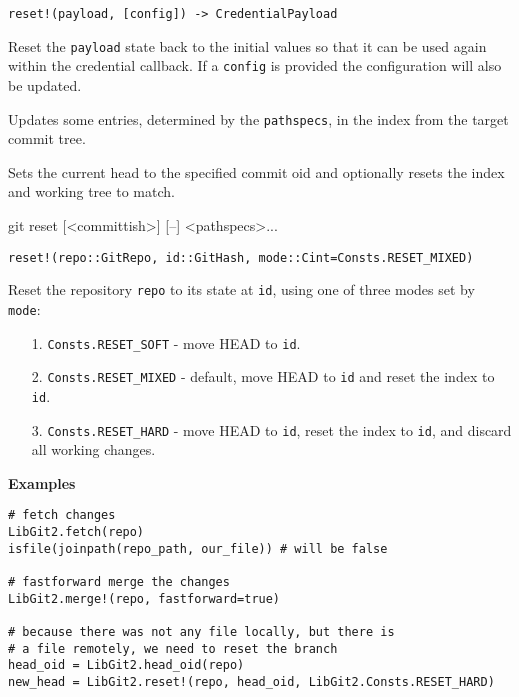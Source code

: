 \begin{adjustwidth}{2em}{0pt}


\begin{verbatim}
reset!(payload, [config]) -> CredentialPayload
\end{verbatim}

Reset the \texttt{payload} state back to the initial values so that it can be used again within the credential callback. If a \texttt{config} is provided the configuration will also be updated.



Updates some entries, determined by the \texttt{pathspecs}, in the index from the target commit tree.



Sets the current head to the specified commit oid and optionally resets the index and working tree to match.



git reset [<committish>] [–] <pathspecs>... 




\begin{lstlisting}
reset!(repo::GitRepo, id::GitHash, mode::Cint=Consts.RESET_MIXED)
\end{lstlisting}

Reset the repository \texttt{repo} to its state at \texttt{id}, using one of three modes set by \texttt{mode}:

\begin{itemize}
\item[1. ] \texttt{Consts.RESET\_SOFT} - move HEAD to \texttt{id}.


\item[2. ] \texttt{Consts.RESET\_MIXED} - default, move HEAD to \texttt{id} and reset the index to \texttt{id}.


\item[3. ] \texttt{Consts.RESET\_HARD} - move HEAD to \texttt{id}, reset the index to \texttt{id}, and discard all working changes.

\end{itemize}
\textbf{Examples}


\begin{verbatim}
# fetch changes
LibGit2.fetch(repo)
isfile(joinpath(repo_path, our_file)) # will be false

# fastforward merge the changes
LibGit2.merge!(repo, fastforward=true)

# because there was not any file locally, but there is
# a file remotely, we need to reset the branch
head_oid = LibGit2.head_oid(repo)
new_head = LibGit2.reset!(repo, head_oid, LibGit2.Consts.RESET_HARD)
\end{verbatim}


\end{adjustwidth}
